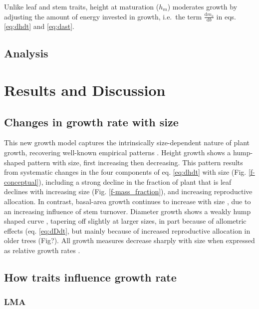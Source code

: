 \documentclass[12pt, a4paper]{article}
\begin{document}
Unlike leaf and stem traits, height at maturation ($h_m$) moderates
growth by adjusting the amount of energy invested in growth, i.e.~the
term $\frac{\textrm{d}m_\textrm{a}}{\textrm{d}b}$ in eqs.
\ref{eq:dhdt} and \ref{eq:dast}.

\subsection{Analysis}\label{analysis}



\newpage
\section{Results and Discussion}\label{results}

\subsection{Changes in growth rate with size}

This new growth model captures the intrinsically size-dependent nature
of plant growth, recovering well-known
empirical patterns \citep{sillett-2010, king-2011}. Height growth shows a hump-shaped pattern
with size, first increasing then decreasing. This pattern results from
systematic changes in the four components of eq. \ref{eq:dhdt} with size
(Fig. \ref{f-conceptual}), including a strong decline in the fraction of plant
that is leaf declines with increasing size (Fig. \ref{f-mass_fraction}),
and increasing reproductive allocation. In contrast, basal-area growth
continues to increase with size \citep{sillett-2010, stephenson-2014},
due to an increasing influence of stem
turnover. Diameter growth shows a weakly hump shaped
curve \citep{herault-2011}, tapering off slightly at larger
sizes, in part because of allometric effects (eq. \ref{eq:dDdt}, but
mainly because of increased reproductive allocation in older trees
(Fig?). All growth measures decrease sharply with size when expressed as
relative growth rates \citep{iida-2014}.


\subsection{How traits influence growth rate}

\subsubsection{LMA}
\end{document}
